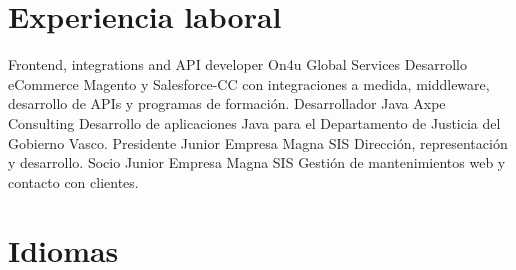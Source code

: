 \documentclass[letterpaper]{twentysecondcv} %
\begin{document}

\section{Experiencia laboral}

\begin{twenty} %
	    {Frontend, integrations and API developer}
    	{On4u Global Services}
    	{Desarrollo eCommerce Magento y Salesforce-CC con integraciones a medida, middleware, desarrollo de APIs y programas de formación.}
	    {Desarrollador Java}
    	{Axpe Consulting}
    	{Desarrollo de aplicaciones Java para el Departamento de Justicia del Gobierno Vasco.}
	    {Presidente}
    	{Junior Empresa Magna SIS}
    	{Dirección, representación y desarrollo.}
	    {Socio}
    	{Junior Empresa Magna SIS} 
    	{Gestión de mantenimientos web y contacto con clientes.}
\end{twenty}


\section{Idiomas}

\begin{twentyshort} %
\end{twentyshort}
\end{document}
